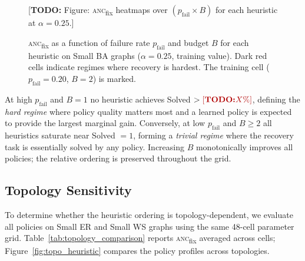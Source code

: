 \documentclass[11pt]{article}
\newcommand{\anc}{\textsc{anc}}
\newcommand{\ancfix}{\anc{}\textsubscript{fix}}
\newcommand{\todo}[1]{\textcolor{red!70!black}{[\textbf{TODO:} #1]}}
\newcommand{\pfail}{p_{\mathrm{fail}}}
\begin{document}
\begin{figure}[htbp]
\centering
\todo{Figure: \ancfix{} heatmaps over $(\pfail \times B)$ for each
heuristic at $\alpha=0.25$.}
\caption{\ancfix{} as a function of failure rate $\pfail$ and budget $B$
         for each heuristic on Small BA graphs ($\alpha=0.25$, training
         value).
         Dark red cells indicate regimes where recovery is hardest.
         The training cell ($\pfail=0.20$, $B=2$) is marked.}
\label{fig:heatmaps}
\end{figure}

At high $\pfail$ and $B=1$ no heuristic achieves Solved $> \todo{X\%}$,
defining the \emph{hard regime} where policy quality matters most and a
learned policy is expected to provide the largest marginal gain.
Conversely, at low $\pfail$ and $B\geq 2$ all heuristics saturate near
Solved $=1$, forming a \emph{trivial regime} where the recovery task is
essentially solved by any policy.
Increasing $B$ monotonically improves all policies; the relative ordering
is preserved throughout the grid.

\subsection{Topology Sensitivity}
\label{sec:topology_heuristic}

To determine whether the heuristic ordering is topology-dependent, we
evaluate all policies on Small ER and Small WS graphs using the same
48-cell parameter grid.
Table~\ref{tab:topology_comparison} reports \ancfix{} averaged across
cells; Figure~\ref{fig:topo_heuristic} compares the policy profiles
across topologies.
\end{document}

